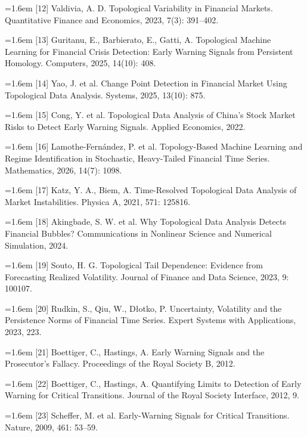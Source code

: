 \documentclass[12pt,a4paper]{ctexart}
\begin{document}
\noindent\hangindent=1.6em [12] Valdivia, A. D. Topological Variability in Financial Markets. Quantitative Finance and Economics, 2023, 7(3): 391–402.\par
\noindent\hangindent=1.6em [13] Guritanu, E., Barbierato, E., Gatti, A. Topological Machine Learning for Financial Crisis Detection: Early Warning Signals from Persistent Homology. Computers, 2025, 14(10): 408.\par
\noindent\hangindent=1.6em [14] Yao, J. et al. Change Point Detection in Financial Market Using Topological Data Analysis. Systems, 2025, 13(10): 875.\par
\noindent\hangindent=1.6em [15] Cong, Y. et al. Topological Data Analysis of China's Stock Market Risks to Detect Early Warning Signals. Applied Economics, 2022.\par
\noindent\hangindent=1.6em [16] Lamothe-Fernández, P. et al. Topology-Based Machine Learning and Regime Identification in Stochastic, Heavy-Tailed Financial Time Series. Mathematics, 2026, 14(7): 1098.\par
\noindent\hangindent=1.6em [17] Katz, Y. A., Biem, A. Time-Resolved Topological Data Analysis of Market Instabilities. Physica A, 2021, 571: 125816.\par
\noindent\hangindent=1.6em [18] Akingbade, S. W. et al. Why Topological Data Analysis Detects Financial Bubbles? Communications in Nonlinear Science and Numerical Simulation, 2024.\par
\noindent\hangindent=1.6em [19] Souto, H. G. Topological Tail Dependence: Evidence from Forecasting Realized Volatility. Journal of Finance and Data Science, 2023, 9: 100107.\par
\noindent\hangindent=1.6em [20] Rudkin, S., Qiu, W., Dłotko, P. Uncertainty, Volatility and the Persistence Norms of Financial Time Series. Expert Systems with Applications, 2023, 223.\par
\noindent\hangindent=1.6em [21] Boettiger, C., Hastings, A. Early Warning Signals and the Prosecutor's Fallacy. Proceedings of the Royal Society B, 2012.\par
\noindent\hangindent=1.6em [22] Boettiger, C., Hastings, A. Quantifying Limits to Detection of Early Warning for Critical Transitions. Journal of the Royal Society Interface, 2012, 9.\par
\noindent\hangindent=1.6em [23] Scheffer, M. et al. Early-Warning Signals for Critical Transitions. Nature, 2009, 461: 53–59.\par
\end{document}
